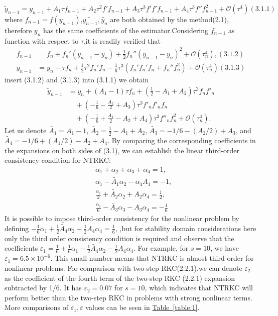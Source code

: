 \documentclass[review]{elsarticle}
\newcommand{\tabref}[1]{\hyperref[#1]{Table~\ref*{#1}}}
\begin{document}
 \begin{equation}
    \tilde{y}_{n-1} = y_{n-1} + A_1\tau f_{n-1} + A_2\tau^2f'f_{n-1} + A_3\tau^3f'f'f_{n-1} + A_4\tau^3f''f^2_{n-1} + \mathcal{O}(\tau^4) (3.1.1)\nonumber
\end{equation}
where $f_{n-1}=f(y_{n-1})$,$ \tilde{y_{n-1}},\tilde{y_n}$ are both obtained by the method(2.1), therefore $y_n$ has the same coefficients of the estimator.Considering $f_{n-1}$ as  function with respect to $\tau$,it is readily verified that 
\begin{align}
    f_{n-1} &= f_n + f_n'(y_{n-1} - y_n) + \frac{1}{2}f_n''(y_{n-1} - y_n)^2 + \mathcal{O}(\tau_n^4), (3.1.2) \nonumber\\
    y_{n-1} &= y_n - \tau f_n + \frac{1}{2}\tau^2f_n'f_n - \frac{1}{6}\tau^3(f_n'f_n'f_n + f_n''f_n^2) + \mathcal{O}(\tau_n^4) (3.1.3)\nonumber
\end{align}
insert (3.1.2) and (3.1.3) into (3.1.1) we obtain
\begin{align}
    \tilde{y}_{n-1} &= y_n + (A_1-1)\tau f_n + \left(\frac{1}{2}-A_1+A_2\right)\tau^2f_nf'_n \nonumber \\
    &\quad + \left(-\frac{1}{6}-\frac{A_2}{2}+A_3\right)\tau^3f'_nf'_nf_n \nonumber\\
    &\quad + \left(-\frac{1}{6}+\frac{A_1}{2}-A_2+A_4\right)\tau^3f''_nf_n^2 + \mathcal{O}(\tau_n^4).\nonumber
\end{align}
Let us denote $\tilde{A_1}=A_1-1$, $\tilde{A_2}=\frac{1}{2}-A_1+A_2$, $\tilde{A_3}=-1/6-(A_2/2)+A_3$, and $\tilde{A_4}=-1/6+(A_1/2)-A_2+A_4$. By comparing the corresponding coefficients in the expansions on both sides of (3.1), we can establish the linear third-order consistency condition for NTRKC:
\begin{align}
    &\alpha _1+\alpha_2+\alpha_3+\alpha _4=1,\nonumber \\
    &\alpha _1-\tilde{A_1}\alpha _2-\alpha _4A_1=-1,\nonumber \\
    &\frac{\alpha _1}{2}+\tilde{A_2}\alpha_2+A_2\alpha _4=\frac{1}{2} ,\nonumber \\
    &\frac{\alpha _1}{6}-\tilde{A_3}\alpha_3-A_3\alpha _4=-\frac{1}{6}   
\end{align}
It is possible to impose third-order consistency for the nonlinear problem  by defining $-\frac{1}{6}\alpha_1+\frac{1}{2}\tilde{A_4}\alpha_2+\frac{1}{2}A_4\alpha_4=\frac{1}{6}$,
,but for stability domain considerations here only the third order consistency condition is required and observe that the coefficients $\varepsilon_1=\frac{1}{6}+\frac{1}{6}\alpha_1-\frac{1}{2}\tilde{A_4}\alpha_2-\frac{1}{2}A_4\alpha_4$.
For example, for $s=10$, we have $\varepsilon_1=6.5\times10^{-6}$. This small number means that NTRKC is almost third-order for nonlinear problems. For comparison with two-step RKC(2.2.1),we can denote $\varepsilon_2$ as the coefficient of the fourth term 
of the two-step RKC (2.2.1) expansion subtracted by 1/6. It has $\varepsilon_2=0.07$ for $s=10$, which indicates that NTRKC will perform better than the two-step RKC in problems with strong nonlinear terms.
More comparisons of $\varepsilon_1,\varepsilon$ values can be seen in \tabref{table:1}.
\end{document}
